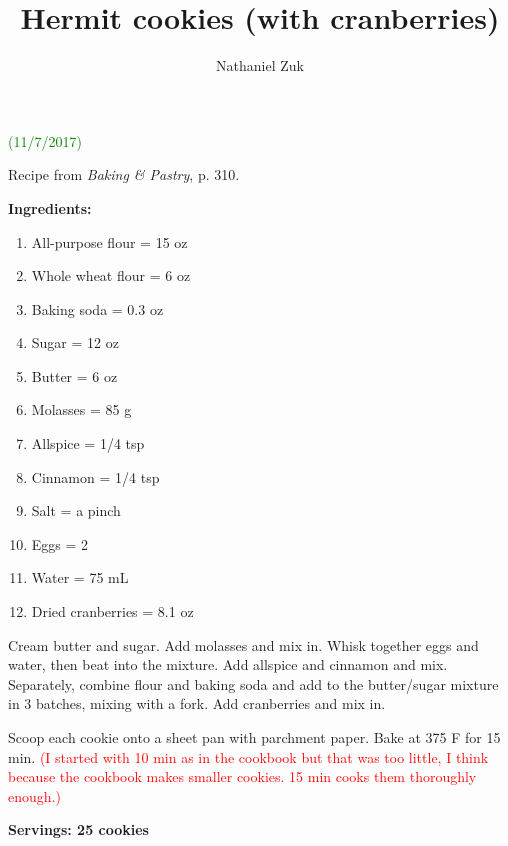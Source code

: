 \usepackage{parskip}
\usepackage{color}

\title{Hermit cookies (with cranberries)}
\author{Nathaniel Zuk}


\maketitle

\textcolor{green}{(11/7/2017)}

Recipe from \textit{Baking \& Pastry}, p. 310.

\textbf{Ingredients:}

\begin{enumerate}
\item All-purpose flour = 15 oz
\item Whole wheat flour = 6 oz
\item Baking soda = 0.3 oz
\item Sugar = 12 oz
\item Butter = 6 oz
\item Molasses = 85 g
\item Allspice = 1/4 tsp
\item Cinnamon = 1/4 tsp
\item Salt = a pinch
\item Eggs = 2
\item Water = 75 mL
\item Dried cranberries = 8.1 oz
\end{enumerate}

Cream butter and sugar.  Add molasses and mix in.  Whisk together eggs and water, then beat into the mixture. Add allspice and cinnamon and mix. Separately, combine flour and baking soda and add to the butter/sugar mixture in 3 batches, mixing with a fork.  Add cranberries and mix in.

Scoop each cookie onto a sheet pan with parchment paper. Bake at 375 F for 15 min. \textcolor{red}{(I started with 10 min as in the cookbook but that was too little, I think because the cookbook makes smaller cookies.  15 min cooks them thoroughly enough.)}

\textbf{Servings: 25 cookies}

